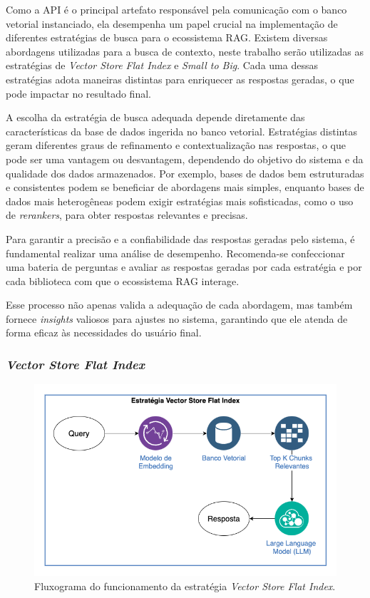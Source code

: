 \documentclass[a4paper, 12pt]{article}
\begin{document}
    Como a API é o principal artefato responsável pela comunicação com o banco vetorial instanciado, ela desempenha um papel crucial na implementação de diferentes estratégias de busca para o ecossistema RAG. Existem diversas abordagens utilizadas para a busca de contexto, neste trabalho serão utilizadas as estratégias de \textit{Vector Store Flat Index} e \textit{Small to Big}. Cada uma dessas estratégias adota maneiras distintas para enriquecer as respostas geradas, o que pode impactar no resultado final.

    A escolha da estratégia de busca adequada depende diretamente das características da base de dados ingerida no banco vetorial. Estratégias distintas geram diferentes graus de refinamento e contextualização nas respostas, o que pode ser uma vantagem ou desvantagem, dependendo do objetivo do sistema e da qualidade dos dados armazenados. Por exemplo, bases de dados bem estruturadas e consistentes podem se beneficiar de abordagens mais simples, enquanto bases de dados mais heterogêneas podem exigir estratégias mais sofisticadas, como o uso de \textit{rerankers}, para obter respostas relevantes e precisas.

    Para garantir a precisão e a confiabilidade das respostas geradas pelo sistema, é fundamental realizar uma análise de desempenho. Recomenda-se confeccionar uma bateria de perguntas e avaliar as respostas geradas por cada estratégia e por cada biblioteca com que o ecossistema RAG interage. 
    
    Esse processo não apenas valida a adequação de cada abordagem, mas também fornece \textit{insights} valiosos para ajustes no sistema, garantindo que ele atenda de forma eficaz às necessidades do usuário final.

    \subsubsection{\textit{Vector Store Flat Index}} \label{sec:vector_search}

    \begin{figure}[ht]
        \includegraphics[width=\textwidth,height=0.9\textheight,keepaspectratio]{vector-strategy.png}
        \centering
        \caption{Fluxograma do funcionamento da estratégia \textit{Vector Store Flat Index}.}
        \centering
        \label{fig:vector_strategy}
    \end{figure}
\end{document}
